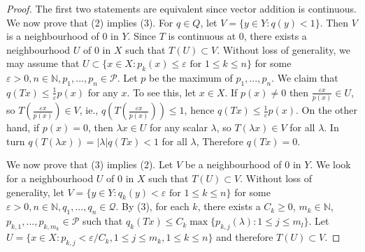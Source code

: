 \begin{proof}
  The first two statements are equivalent since vector addition is continuous.
  We now prove that (2) implies (3). For $q\in Q$, let $V=\{y\in Y:q(y)<1\}$.
  Then $V$ is a neighbourhood of $0$ in $Y$. Since $T$ is continuous at $0$,
  there exists a neighbourhood $U$ of $0$ in $X$ such that $T(U)\subset V$.
  Without loss of generality, we may assume that
  $U\subset \{x\in X:\text{$p_k(x)\leq \varepsilon$ for $1\leq k\leq n$} \}$
  for some $\varepsilon>0,n\in\mathbb{N},p_1,...,p_n\in\mathcal{P}$.
  Let $p$ be the maximum of $p_1,...,p_n$.
  We claim that
  $q(Tx)\leq \frac{1}{\varepsilon}p(x)$ for any $x$.
  To see this, let $x\in X$.
  If $p(x)\neq 0$ then $\frac{\varepsilon x}{p(x)}\in U$, so $T(\frac{\varepsilon x}{p(x)})\in V$, ie.,
  $q(T(\frac{\varepsilon x}{p(x)}))\leq 1$, hence
  $q(Tx)\leq \frac{1}{\varepsilon}p(x)$.
  On the other hand, if $p(x)=0$, then $\lambda x\in U$ for any scalar $\lambda$,
  so $T(\lambda x)\in V$ for all $\lambda$.
  In turn $q(T(\lambda x))=|\lambda|q(Tx)<1$ for all $\lambda$,
  Therefore $q(Tx)=0$.

  We now prove that (3) implies (2).
  Let $V$ be a neighbourhood of $0$ in $Y$. We look for a neighbourhood $U$ of $0$ in $X$
  such that $T(U)\subset V$.
  Without loss of generality,
  let $V=\{y\in Y:\text{$q_k(y)<\varepsilon$ for $1\leq k\leq n$}\}$ for some
  $\varepsilon>0,n\in\mathbb{N},q_1,...,q_n\in\mathcal{Q}$.
  By (3), for each $k$, there exists a $C_k\geq 0$, $m_k\in\mathbb{N}$, $p_{k,1},...,p_{k,m_k}\in\mathcal{P}$
  such that
  $q_k(Tx)\leq C_k \max\{p_{k,j}(\lambda):1\leq j\leq m_l\}$.
  Let
  $U=\{x\in X:p_{k,j}<\varepsilon / C_k, 1\leq j\leq m_k, 1\leq k\leq n\}$
  and therefore $T(U)\subset V$.
\end{proof}













%
